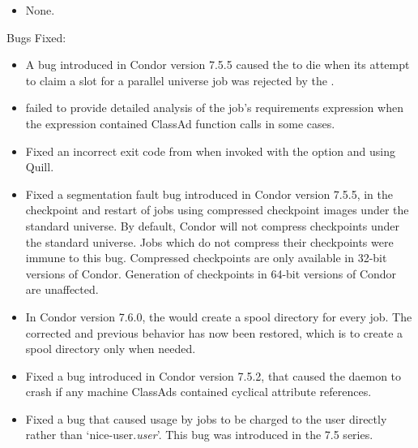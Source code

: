 \begin{itemize}

\item None.

\end{itemize}

\noindent Bugs Fixed:

\begin{itemize}

\item A bug introduced in Condor version 7.5.5 caused the 
to die when its attempt to claim a slot for a parallel universe job 
was rejected by the . 

\item {}  failed to provide detailed analysis of
the job's requirements expression when the expression contained ClassAd
function calls in some cases. 

\item Fixed an incorrect exit code from  
when invoked with the  option and using Quill.

\item Fixed a segmentation fault bug introduced in Condor version 7.5.5,
in the checkpoint and restart of jobs using compressed checkpoint images
under the standard universe.
By default, Condor will not compress checkpoints under the standard universe.
Jobs which do not compress their checkpoints were immune to this bug.  
Compressed checkpoints are only available in 32-bit versions of Condor.
Generation of checkpoints in 64-bit versions of Condor are unaffected.

\item In Condor version 7.6.0, the  would create a 
spool directory for every job. The corrected and previous behavior 
has now been restored, 
which is to create a spool directory only when needed.

\item Fixed a bug introduced in Condor version 7.5.2,
that caused the  daemon to crash
if any machine ClassAds contained cyclical attribute references.

\item Fixed a bug that caused usage by  jobs to
be charged to the user directly rather than `nice-user.\emph{user}'.
This bug was introduced in the 7.5 series.


\end{itemize}
